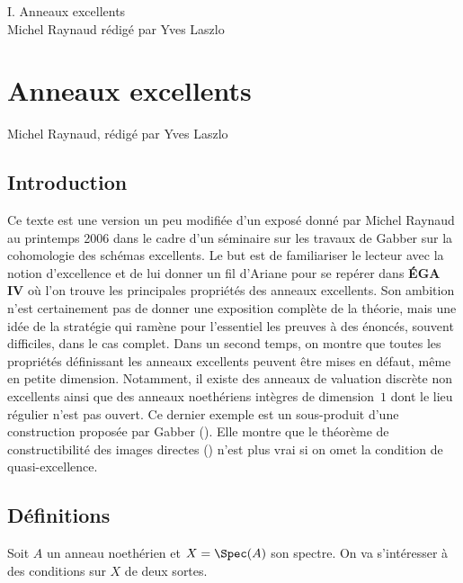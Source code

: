 \documentclass[10pt]{../fichiers-configuration-latex/smfart}
\begin{document}
\begin{center}
I. Anneaux excellents\\
Michel Raynaud rédigé par Yves Laszlo
\end{center}

\tableofcontents

\else
{}
\chapter{Anneaux excellents}
\begin{center}
Michel Raynaud, rédigé par Yves Laszlo
\end{center}
\fi

\section{Introduction} Ce texte est une version  un peu modifiée d'un exposé donné par Michel
Raynaud au printemps 2006 dans le cadre d'un séminaire sur les travaux de Gabber sur la cohomologie
des schémas excellents. Le but est de familiariser le lecteur avec la notion d'excellence et de lui
donner un fil d'Ariane pour se repérer dans \textbf{ÉGA IV} où l'on trouve les principales
propriétés des anneaux excellents. Son ambition n'est certainement pas de donner une exposition
complète de la théorie, mais une idée de la stratégie qui ramène pour l'essentiel les preuves à des
énoncés, souvent difficiles, dans le cas complet. Dans un second temps, on montre que toutes les
propriétés définissant les anneaux excellents peuvent être mises en défaut, même en petite
dimension. Notamment, il existe des anneaux de valuation discrète non excellents ainsi que des
anneaux noethériens intègres de dimension $1$ dont le lieu régulier n'est pas ouvert. Ce dernier
exemple est un sous-produit d'une construction proposée par Gabber ().
Elle montre que le théorème de constructibilité des images directes
() n'est plus vrai si on omet la condition de quasi-excellence.



\section{Définitions} Soit $A$ un anneau noethérien et $X=\Spec(A)$ son spectre. On va s'intéresser
à des conditions sur $X$ de deux sortes.
\end{document}
